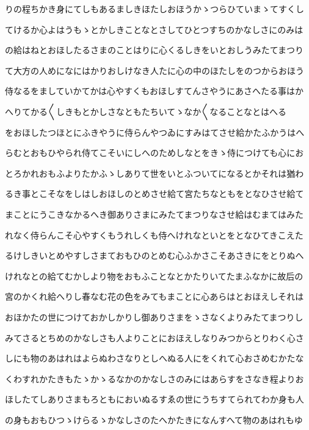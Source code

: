 \documentclass[a4paper,11pt,landscape]{ltjtarticle}
\begin{document}
\par\medskip
りの程ちかき身にてしもあるましきほたしおほうかゝつらひていまゝてすくし
\par\medskip
てけるか心よはうもゝとかしきことなとさしてひとつすちのかなしさにのみは
\par\medskip
の給はねとおほしたるさまのことはりに心くるしきをいとおしうみたてまつり
\par\medskip
て大方の人めになにはかりおしけなき人たに心の中のほたしをのつからおほう
\par\medskip
侍なるをましていかてかは心やすくもおほしすてんさやうにあさへたる事はか
\par\medskip
へりてかる〱しきもとかしさなともたちいてゝなか〱なることなとはへる
\par\medskip
をおほしたつほとにふきやうに侍らんやつゐにすみはてさせ給かたふかうはへ
\par\medskip
らむとおもひやられ侍てこそいにしへのためしなとをきゝ侍につけても心にお
\par\medskip
とろかれおもふよりたかふゝしありて世をいとふついてになるとかそれは猶わ
\par\medskip
るき事とこそなをしはしおほしのとめさせ給て宮たちなともをとなひさせ給て
\par\medskip
まことにうこきなかるへき御ありさまにみたてまつりなさせ給はむまてはみた
\par\medskip
れなく侍らんこそ心やすくもうれしくも侍へけれなといとをとなひてきこえた
\par\medskip
るけしきいとめやすしさまておもひのとめむ心ふかさこそあさきにをとりぬへ
\par\medskip
けれなとの給てむかしより物をおもふことなとかたりいてたまふなかに故后の
\par\medskip
宮のかくれ給へりし春なむ花の色をみてもまことに心あらはとおほえしそれは
\par\medskip
おほかたの世につけておかしかりし御ありさまをゝさなくよりみたてまつりし
\par\medskip
みてさるとちめのかなしさも人よりことにおほえしなりみつからとりわく心さ
\par\medskip
しにも物のあはれはよらぬわさなりとしへぬる人にをくれて心おさめむかたな
\par\medskip
くわすれかたきもたゝかゝるなかのかなしさのみにはあらすをさなき程よりお
\par\medskip
ほしたてしありさまもろともにおいぬるすゑの世にうちすてられてわか身も人
\par\medskip
の身もおもひつゝけらるゝかなしさのたへかたきになんすへて物のあはれもゆ
\end{document}
